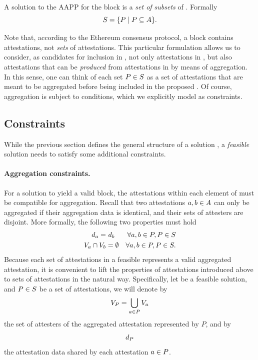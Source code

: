\documentclass{article}
\begin{document}
A solution \solution{} to the AAPP for the block \block{} is a \emph{set of
subsets} of \attestations. Formally 
%
\begin{equation}
  S = \{ P \mid P \subseteq A\}.
\end{equation}

Note that, according to the Ethereum consensus protocol, a block contains
attestations, not \emph{sets} of attestations. This particular formulation
allows us to consider, as candidates for inclusion in \block, not only
attestations in \attestations{}, but also attestations that can be
\emph{produced} from attestations in \attestations{} by means of aggregation.
In this sense, one can think of each set $P \in S$ as a set of
attestations that are meant to be aggregated before being included in the
proposed \block.  Of course, aggregation is subject to conditions, which we
explicitly model as constraints.  

\subsection{Constraints}

While the previous section defines the general structure of a solution
\solution, a \emph{feasible} solution needs to satisfy some additional
constraints.

\paragraph{\textbf{Aggregation constraints.}} For a solution \solution{} to
yield a valid block, the attestations within each element of \solution{} must
be compatible for aggregation. Recall that two attestations $a, b \in
A$ can only be aggregated if their aggregation data is identical,
and their sets of attesters are disjoint. More formally, the following two
properties must hold
%
\begin{align}
  d_{a} =&~d_{b} &  \forall a, b \in P, P \in S\\
  V_{a} \cap V_{b} &= \emptyset & \forall a, b \in P, P \in S.
\end{align}
%
Because each set of attestations in a feasible \solution{} represents a valid
aggregated attestation, it is convenient to lift the properties of attestations
introduced above to sets of attestations in the natural way. Specifically, let
\solution{} be a feasible solution, and $P \in S$ be a set of
attestations, we will denote by 
%
\begin{equation}
  V_{P} = \bigcup_{a \in P} V_{a}
\end{equation}
%
the set of attesters of the aggregated attestation represented by $P$, and by
%
\begin{equation}
  d_{P} 
\end{equation}
%
the attestation data shared by each attestation $a \in P$.
\end{document}
